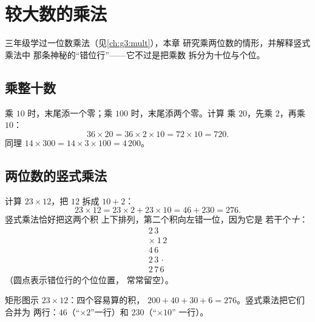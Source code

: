 \chapter{较大数的乘法}\label{ch:g4:mult}

三年级学过一位数乘法（见\cref{ch:g3:mult}），本章
研究乘两位数的情形，并解释竖式乘法中
那条神秘的“错位行”——它不过是把乘数
拆分为十位与个位。

\section{乘整十数}

\begin{proposition}[乘 10、20、300\,\dots]\label{prop:g4:mult:tens}
乘 $10$ 时，末尾添一个零；乘 $100$ 时，末尾添两个零。计算
乘 $20$，先乘 $2$，再乘 $10$：
\[
36 \times 20 = 36 \times 2 \times 10 = 72 \times 10 = 720 .
\]
同理 $14 \times 300 = 14 \times 3 \times 100 = 4\,200$。
\end{proposition}
\admitted

\section{两位数的竖式乘法}

\begin{example}[为什么要错位？]\label{ex:g4:mult:why}
计算 $23 \times 12$，把 $12$ 拆成 $10 + 2$：
\[
23 \times 12 = 23 \times 2 + 23 \times 10 = 46 + 230 = 276 .
\]
竖式乘法恰好把这两个积
上下排列，第二个积向左错一位，因为它是
若干个\emph{十}：
\[
\begin{array}{r}
2\,3 \\
\times\ 1\,2 \\
\hline
4\,6 \\
2\,3\,\cdot \\
\hline
2\,7\,6
\end{array}
\]
（圆点表示错位行的个位位置，
常常留空）。
\end{example}

\begin{omfigure}

{\small 矩形图示 $23 \times 12$：四个容易算的积，
$200 + 40 + 30 + 6 = 276$。竖式乘法把它们合并为
两行：$46$（“$\times 2$”一行）和 $230$（“$\times 10$”
一行）。}
\end{omfigure}

